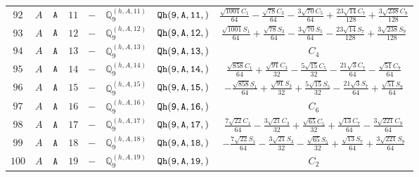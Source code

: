 \documentclass[fleqn,8pt]{jsarticle}
\begin{document}
\begin{table}[ht!]
\begin{center}
\begin{tabular}{cccccccc}
$ 92 $ & $ A $ & $ {\tt A} $ & $ 11 $ & $ - $ & $ \mathbb{Q}_{9}^{(h,A,11)} $ & $ {\tt Qh(9,A,11,)} $ & $ \frac{\sqrt{1001} C_{1}}{64} - \frac{\sqrt{78} C_{3}}{64} - \frac{3 \sqrt{70} C_{5}}{64} + \frac{23 \sqrt{14} C_{7}}{128} + \frac{3 \sqrt{238} C_{9}}{128} $ \\
$ 93 $ & $ A $ & $ {\tt A} $ & $ 12 $ & $ - $ & $ \mathbb{Q}_{9}^{(h,A,12)} $ & $ {\tt Qh(9,A,12,)} $ & $ \frac{\sqrt{1001} S_{1}}{64} + \frac{\sqrt{78} S_{3}}{64} - \frac{3 \sqrt{70} S_{5}}{64} - \frac{23 \sqrt{14} S_{7}}{128} + \frac{3 \sqrt{238} S_{9}}{128} $ \\
$ 94 $ & $ A $ & $ {\tt A} $ & $ 13 $ & $ - $ & $ \mathbb{Q}_{9}^{(h,A,13)} $ & $ {\tt Qh(9,A,13,)} $ & $ C_{4} $ \\
$ 95 $ & $ A $ & $ {\tt A} $ & $ 14 $ & $ - $ & $ \mathbb{Q}_{9}^{(h,A,14)} $ & $ {\tt Qh(9,A,14,)} $ & $ \frac{\sqrt{858} C_{1}}{64} + \frac{\sqrt{91} C_{3}}{32} - \frac{5 \sqrt{15} C_{5}}{32} - \frac{21 \sqrt{3} C_{7}}{64} - \frac{\sqrt{51} C_{9}}{64} $ \\
$ 96 $ & $ A $ & $ {\tt A} $ & $ 15 $ & $ - $ & $ \mathbb{Q}_{9}^{(h,A,15)} $ & $ {\tt Qh(9,A,15,)} $ & $ - \frac{\sqrt{858} S_{1}}{64} + \frac{\sqrt{91} S_{3}}{32} + \frac{5 \sqrt{15} S_{5}}{32} - \frac{21 \sqrt{3} S_{7}}{64} + \frac{\sqrt{51} S_{9}}{64} $ \\
$ 97 $ & $ A $ & $ {\tt A} $ & $ 16 $ & $ - $ & $ \mathbb{Q}_{9}^{(h,A,16)} $ & $ {\tt Qh(9,A,16,)} $ & $ C_{6} $ \\
$ 98 $ & $ A $ & $ {\tt A} $ & $ 17 $ & $ - $ & $ \mathbb{Q}_{9}^{(h,A,17)} $ & $ {\tt Qh(9,A,17,)} $ & $ \frac{7 \sqrt{22} C_{1}}{64} - \frac{3 \sqrt{21} C_{3}}{32} + \frac{\sqrt{65} C_{5}}{32} + \frac{\sqrt{13} C_{7}}{64} - \frac{3 \sqrt{221} C_{9}}{64} $ \\
$ 99 $ & $ A $ & $ {\tt A} $ & $ 18 $ & $ - $ & $ \mathbb{Q}_{9}^{(h,A,18)} $ & $ {\tt Qh(9,A,18,)} $ & $ - \frac{7 \sqrt{22} S_{1}}{64} - \frac{3 \sqrt{21} S_{3}}{32} - \frac{\sqrt{65} S_{5}}{32} + \frac{\sqrt{13} S_{7}}{64} + \frac{3 \sqrt{221} S_{9}}{64} $ \\
$ 100 $ & $ A $ & $ {\tt A} $ & $ 19 $ & $ - $ & $ \mathbb{Q}_{9}^{(h,A,19)} $ & $ {\tt Qh(9,A,19,)} $ & $ C_{2} $ \\
 \hline \hline
\end{tabular}
\end{center}
\end{table}
\end{document}
